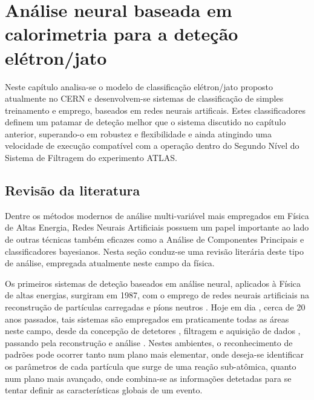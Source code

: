 \typeout{ ====================================================================}
\typeout{ ====================================================================}

\chapter{Análise neural baseada em calorimetria para a deteção
elétron/jato} 
\label{chap:neural}

Neste capítulo analisa-se o modelo de classificação elétron/jato proposto
atualmente no CERN e desenvolvem-se sistemas de classificação de simples
treinamento e emprego, baseados em redes neurais artificais. Estes
classificadores definem um patamar de deteção melhor que o sistema discutido
no capítulo anterior, superando-o em robustez e flexibilidade e ainda
atingindo uma velocidade de execução compatível com a operação dentro do
Segundo Nível do Sistema de Filtragem do experimento ATLAS.

\section{Revisão da literatura}
\label{sec:review}

Dentre os métodos modernos de análise multi-variável mais empregados em Física
de Altas Energia, Redes Neurais Artificiais possuem um papel importante ao
lado de outras técnicas também eficazes como a Análise de Componentes
Principais e classificadores bayesianos. Nesta seção conduz-se uma revisão
literária deste tipo de análise, empregada atualmente neste campo da física.

Os primeiros sistemas de deteção baseados em análise neural, aplicados à
Física de altas energias, surgiram em 1987, com o emprego de redes neurais
artificiais na reconstrução de partículas carregadas e píons neutros
\cite{denby-nim-1997}. Hoje em dia \cite{denby-nim-2004}, cerca de 20 anos
passados, tais sistemas são empregados em praticamente todas as áreas neste
campo, desde da concepção de detetores \cite{wilk-nim-2006}, filtragem e
aquisição de dados \cite{denby-nim-2003, kohne-nim-1997, varela-cms-1998},
passando pela reconstrução  \cite{peterson-nim-1988} e análise
\cite{kiesling-nim-2004, bhat-aip-1995}. Nestes ambientes, o reconhecimento de
padrões pode ocorrer tanto num plano mais elementar, onde deseja-se
identificar os parâmetros de cada partícula que surge de uma reação
sub-atômica, quanto num plano mais avançado, onde combina-se as informações
detetadas para se tentar definir as características globais de um evento.

